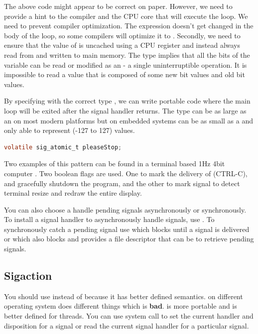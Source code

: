 The above code might appear to be correct on paper.
However, we need to provide a hint to the compiler and the CPU core that will execute the  loop.
We need to prevent compiler optimization.
The expression  doesn't get changed in the body of the loop, so some compilers will optimize it to  .
Secondly, we need to ensure that the value of  is uncached using a CPU register and instead always read from and written to main memory.
The  type implies that all the bits of the variable can be read or modified as an  - a single uninterruptible operation.
It is impossible to read a value that is composed of some new bit values and old bit values.

By specifying  with the correct type , we can write portable code where the main loop will be exited after the signal handler returns.
The  type can be as large as an  on most modern platforms but on embedded systems can be as small as a  and only able to represent (-127 to 127) values.

\begin{lstlisting}[language=C]
volatile sig_atomic_t pleaseStop;
\end{lstlisting}

Two examples of this pattern can be found in  a terminal based 1Hz 4bit computer \cite{Sorn_2015}.
Two boolean flags are used.
One to mark the delivery of  (CTRL-C), and gracefully shutdown the program, and the other to mark  signal to detect terminal resize and redraw the entire display.

You can also choose a handle pending signals asynchronously or synchronously.
To install a signal handler to asynchronously handle signals, use .
To synchronously catch a pending signal use  which blocks until a signal is delivered or  which also blocks and provides a file descriptor that can be  to retrieve pending signals.

\subsection{Sigaction}

You should use  instead of  because it has better defined semantics.
 on different operating system does different things which is \textbf{bad}.
 is more portable and is better defined for threads.
You can use system call  to set the current handler and disposition for a signal or read the current signal handler for a particular signal.

